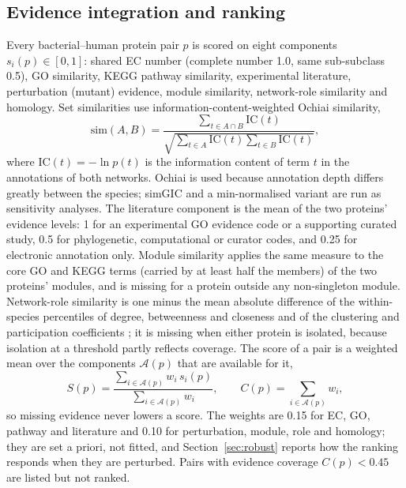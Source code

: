 \documentclass[conference]{IEEEtran}
\begin{document}
\subsection{Evidence integration and ranking}

Every bacterial--human protein pair $p$ is scored on eight components $s_i(p) \in [0,1]$:
shared EC number (complete number 1.0, same sub-subclass 0.5), GO similarity, KEGG pathway
similarity, experimental literature, perturbation (mutant) evidence, module similarity, network-role
similarity and homology. Set similarities use information-content-weighted Ochiai similarity,
\begin{equation}
\mathrm{sim}(A,B) = \frac{\sum_{t \in A \cap B} \mathrm{IC}(t)}
{\sqrt{\sum_{t \in A} \mathrm{IC}(t) \sum_{t \in B} \mathrm{IC}(t)}},
\end{equation}
where $\mathrm{IC}(t) = -\ln p(t)$ is the information content of term $t$ in the annotations of
both networks. Ochiai is used because annotation depth differs greatly between the species; simGIC
\cite{pesquita2008} and a min-normalised variant are run as sensitivity analyses. The literature
component is the mean of the two proteins' evidence levels: 1 for an experimental GO evidence code
or a supporting curated study, 0.5 for phylogenetic, computational or curator codes, and 0.25 for
electronic annotation only. Module similarity applies the same measure to the core GO and KEGG
terms (carried by at least half the members) of the two proteins' modules, and is missing for a
protein outside any non-singleton module. Network-role similarity is one minus the mean absolute
difference of the within-species percentiles of degree, betweenness and closeness and of the
clustering and participation coefficients \cite{guimera2005}; it is missing when either protein is
isolated, because isolation at a threshold partly reflects coverage. The score of a pair is a
weighted mean over the components $\mathcal{A}(p)$ that are available for it,
\begin{equation}
S(p) = \frac{\sum_{i \in \mathcal{A}(p)} w_i\, s_i(p)}{\sum_{i \in \mathcal{A}(p)} w_i},
\qquad C(p) = \sum_{i \in \mathcal{A}(p)} w_i ,
\end{equation}
so missing evidence never lowers a score. The weights are 0.15 for EC, GO, pathway and literature
and 0.10 for perturbation, module, role and homology; they are set a priori, not fitted, and
Section~\ref{sec:robust} reports how the ranking responds when they are perturbed. Pairs with
evidence coverage $C(p) < 0.45$
are listed but not ranked.
\end{document}
